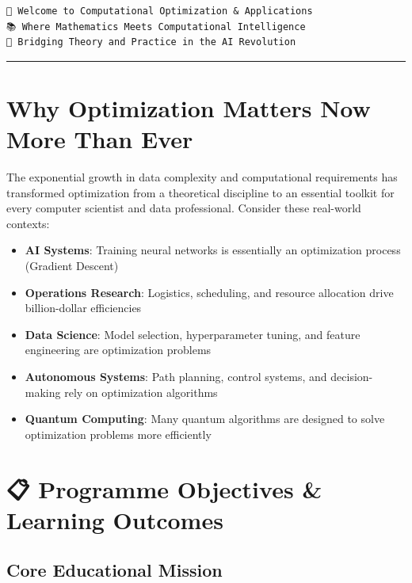 \documentclass[
  letterpaper,
  DIV=11,
  numbers=noendperiod]{scrreprt}
\providecommand{\tightlist}{%
  \setlength{\itemsep}{0pt}\setlength{\parskip}{0pt}}
\begin{document}
\begin{verbatim}
🚀 Welcome to Computational Optimization & Applications
📚 Where Mathematics Meets Computational Intelligence
🌉 Bridging Theory and Practice in the AI Revolution
\end{verbatim}

\begin{center}\rule{0.5\linewidth}{0.5pt}\end{center}

\section{Why Optimization Matters Now More Than
Ever}\label{why-optimization-matters-now-more-than-ever}

The exponential growth in data complexity and computational requirements
has transformed optimization from a theoretical discipline to an
essential toolkit for every computer scientist and data professional.
Consider these real-world contexts:

\begin{itemize}
\tightlist
\item
  \textbf{AI Systems}: Training neural networks is essentially an
  optimization process (Gradient Descent)
\item
  \textbf{Operations Research}: Logistics, scheduling, and resource
  allocation drive billion-dollar efficiencies\\
\item
  \textbf{Data Science}: Model selection, hyperparameter tuning, and
  feature engineering are optimization problems
\item
  \textbf{Autonomous Systems}: Path planning, control systems, and
  decision-making rely on optimization algorithms
\item
  \textbf{Quantum Computing}: Many quantum algorithms are designed to
  solve optimization problems more efficiently
\end{itemize}

\section{📋 Programme Objectives \& Learning
Outcomes}\label{programme-objectives-learning-outcomes}

\subsection{Core Educational Mission}\label{core-educational-mission}
\end{document}
